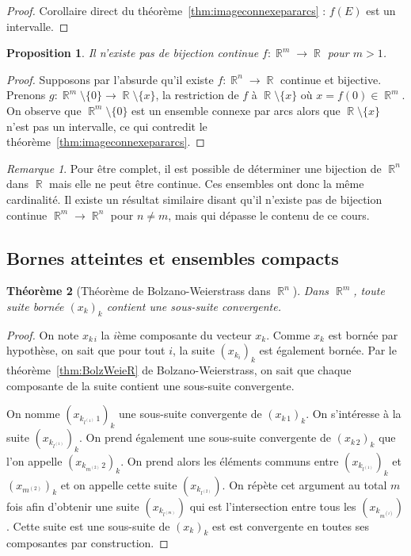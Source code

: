 \documentclass{article}
\DeclareMathOperator{\R}{\mathbb R}
\newtheorem{thm}{Théorème}[section]
\newtheorem{prp}[thm]{Proposition}
\theoremstyle{definition}
\theoremstyle{remark}
\newtheorem*{rmq}{Remarque}
\begin{document}
		\begin{proof} Corollaire direct du théorème~\ref{thm:imageconnexepararcs} : $f(E)$ est un intervalle. \end{proof}

		\begin{prp} Il n'existe pas de bijection continue $f : \R^m \to \R$ pour $m > 1$. \end{prp}

		\begin{proof} Supposons par l'absurde qu'il existe $f : \R^n \to \R$ continue et bijective. Prenons $g : \R^m \setminus \{0\} \to \R \setminus \{x\}$,
		la restriction de $f$ à $\R \setminus \{x\}$ où $x = f(0) \in \R^m$. On observe que $\R^m \setminus \{0\}$ est un ensemble connexe par arcs alors
		que $\R \setminus \{x\}$ n'est pas un intervalle, ce qui contredit le théorème~\ref{thm:imageconnexepararcs}.
		\end{proof}

		\begin{rmq} Pour être complet, il est possible de déterminer une bijection de $\R^n$ dans $\R$ mais elle ne peut être continue. Ces ensembles ont donc
		la même cardinalité. Il existe un résultat similaire disant qu'il n'existe pas de bijection continue $\R^m \to \R^n$ pour $n \neq m$, mais qui dépasse
		le contenu de ce cours.
		\end{rmq}

	\subsection{Bornes atteintes et ensembles compacts}
		\begin{thm}[Théorème de Bolzano-Weierstrass dans $\R^n$]\label{thm:BolzWeierRn} Dans $\R^m$, toute suite bornée $(x_k)_k$ contient une sous-suite
		convergente.
		\end{thm}

		\begin{proof} On note $x_{k\,i}$ la $i$ème composante du vecteur $x_k$. Comme $x_k$ est bornée par hypothèse, on sait que pour tout $i$, la suite
		$(x_{k_i})_k$ est également bornée. Par le théorème~\ref{thm:BolzWeieR} de Bolzano-Weierstrass, on sait que chaque composante de la suite contient
		une sous-suite convergente.

		On nomme $(x_{k_{l^{(1)}}\,1})_k$ une sous-suite convergente de $(x_{k\,1})_k$. On s'intéresse à la suite $(x_{k_{l^{(1)}}})_k$. On prend également une
		sous-suite convergente de $(x_{k\,2})_k$ que l'on appelle $(x_{k_{m^{(2)}}\,2})_k$. On prend alors les éléments communs entre $(x_{k_{l^{(1)}}})_k$
		et $(x_{m^{(2)}})_k$ et on appelle cette suite $(x_{k_{l^{(2)}}})$. On répète cet argument au total $m$ fois afin d'obtenir une suite
		$(x_{k_{l^{(m)}}})$ qui est l'intersection entre tous les $(x_{k_{m^{(i)}}})$. Cette suite est une sous-suite de $(x_k)_k$ est est convergente en
		toutes ses composantes par construction.
		\end{proof}
\end{document}
